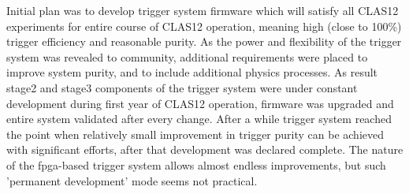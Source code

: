 Initial plan was to develop trigger system firmware which will satisfy all CLAS12 experiments for entire course of CLAS12 operation, meaning high (close to 100\%) trigger efficiency and reasonable purity. As the power and flexibility of the trigger system was revealed to community, additional requirements were placed to improve system purity, and to include additional physics processes. As result stage2 and stage3 components of the trigger system were under constant development during first year of CLAS12 operation, firmware was upgraded and entire system validated after every change. After a while trigger system reached the point when relatively small improvement in trigger purity can be achieved with significant efforts, after that development was declared complete. The nature of the fpga-based trigger system allows almost endless improvements, but such 'permanent development' mode seems not practical.
